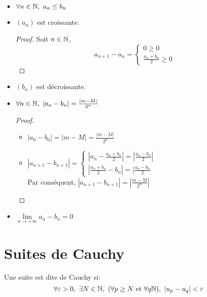 \documentclass[../main.tex]{subfile}
\begin{document}
\begin{prop}
	$\phantom{a}$\\
	\begin{itemize}
		\item $\forall n \in \mathbb{N}, \ a_n \leq b_n$
		\item $(a_n)$ est croissante.
		\begin{proof}
			Soit $n \in \mathbb{N}$, \\
			$$a_{n+1} - a_n = 
			\left \{
				\begin{array}{l}
					0 \geq 0\\
					\frac{a_n + b_n}{2} \geq 0
				\end{array}
			\right .
			$$
		\end{proof}

		\item $(b_n)$ est décroissante.
		\item $\forall n \in \mathbb{N}, \ |a_n - b_n| = \frac{|m - M|}{2^n}$
		\begin{proof}
		$\phantom{a}$\\
			\begin{itemize}
				\item $|a_0 - b_0| = |m - M| = \frac{|m - M|}{2^0}$
				\item $|a_{n+1} - b_{n+1}| = 
				\left \{
					\begin{array}{l}
						|a_n - \frac{a_n + b_n}{2}| = |\frac{a_n - b_n}{2}|\\
						|\frac{a_n + b_n}{2} - b_n| = |\frac{a_n - b_n}{2}
					\end{array}
				\right .
				$\\
				Par conséquent, $|a_{n+1} - b_{n+1}| = |\frac{m-M}{2^n}|$
			\end{itemize}
		\end{proof}
		
		\item $\lim\limits_{n \to + \infty} a_n - b_n = 0$
	\end{itemize}
\end{prop}

\section{Suites de Cauchy}
\begin{defi}
	Une suite est dite de Cauchy si:
	$$\forall \varepsilon > 0, \ \exists N \in \mathbb{N}, \ (\forall p \geq N \text{ et } \forall q \mathbb{N}), \ |u_p - u_q| < \varepsilon$$
\end{defi}
\end{document}
